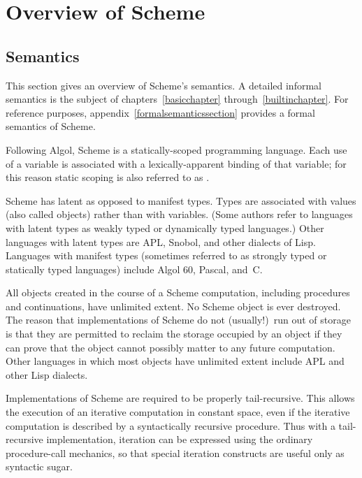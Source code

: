 
\chapter{Overview of Scheme}

\section{Semantics}
\label{semanticsection}

This section gives an overview of Scheme's semantics.  A
detailed informal semantics is the subject of
chapters~\ref{basicchapter} through~\ref{builtinchapter}.  For reference
purposes, appendix~\ref{formalsemanticssection} provides a formal
semantics of Scheme.

\vest Following Algol, Scheme is a statically-scoped
programming language.  Each use of a variable is associated with a
lexically-apparent binding of that variable; for this reason static
scoping is also referred to as .

\vest Scheme has latent as opposed to manifest types.
Types are associated with values (also called
objects) rather than with variables.  (Some authors
refer to languages with latent types as weakly typed or dynamically
typed languages.)  Other languages with latent types are APL, Snobol,
and other dialects of Lisp.  Languages with manifest types (sometimes
referred to as strongly typed or statically typed languages) include
Algol 60, Pascal, and~C.

\vest All objects created in the course of a Scheme computation, including
procedures and continuations, have unlimited extent.
No Scheme object is ever destroyed.  The reason that
implementations of Scheme do not (usually!)\ run out of storage is that
they are permitted to reclaim the storage occupied by an object if
they can prove that the object cannot possibly matter to any future
computation.  Other languages in which most objects have unlimited
extent include APL and other Lisp dialects.

Implementations of Scheme are required to be properly
tail-recursive\cite{Rabbit}.  This allows the execution of an
iterative computation in constant space, even if the iterative
computation is described by a syntactically recursive procedure.  Thus
with a tail-recursive implementation, iteration can be expressed using
the ordinary procedure-call mechanics, so that special iteration
constructs are useful only as syntactic sugar.

